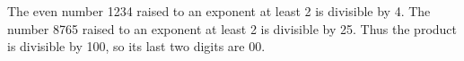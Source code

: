 The even number 1234 raised to an exponent at least 2 is divisible by 4. The number 8765 raised to an exponent at least 2 is divisible by 25. Thus the product is divisible by 100, so its last two digits are $\boxed{00}$.
